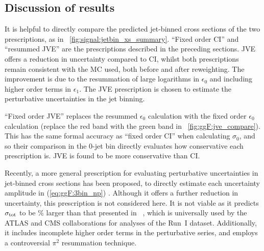 \subsection{Discussion of results}

It is helpful to directly compare the predicted jet-binned cross sections of the two 
prescriptions, as in \Figure~\ref{fig:signal:jetbin_xs_summary}. ``Fixed order CI'' and 
``resummed JVE'' are the prescriptions described in the preceding sections. JVE offers a 
reduction in uncertainty compared to CI, whilst both prescriptions remain consistent with 
the  MC used, both before and after \ptH reweighting. The 
improvement is due to the resummation of large logarithms in $\epsilon_0$ and including 
higher order terms in $\epsilon_1$. The JVE prescription is chosen to estimate the 
perturbative uncertainties in the jet binning.

``Fixed order JVE'' replaces the resummed $\epsilon_0$ calculation with the fixed order 
$\epsilon_0$ calculation (\ie replace the red band with the green band in 
\Figure~\ref{fig:ggF:jve_compare}). This has the same formal accuracy as ``fixed order CI'' 
when calculating $\sigma_0$, and so their comparison in the 0-jet bin directly evaluates 
how conservative each prescription is. JVE is found to be more conservative than CI.

Recently, a more general prescription for evaluating perturbative uncertainties in 
jet-binned cross sections has been proposed, to directly estimate each uncertainty 
amplitude in (\ref{eq:ggF:3bin_np}) \cite{BLTPW:2013}. Although it offers a further 
reduction in uncertainty, this prescription is not considered here. It is not viable as 
it predicts $\sigma_{\text{tot}}$ to be \% larger than that presented in 
\Reference~\cite{YR3}, which is universally used by the ATLAS and CMS collaborations for 
analyses of the Run~I dataset. Additionally, it includes incomplete higher order terms in 
the perturbative series, and employs a controversial $\pi^2$ resummation technique.

